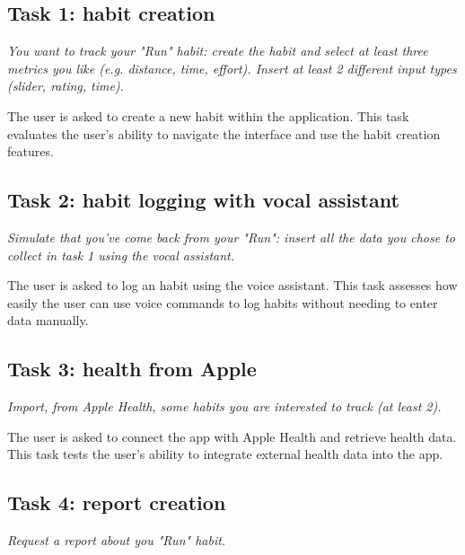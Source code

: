\documentclass{article}
\begin{document}
\subsection{Task 1: habit creation}

\begin{center}
	\textit{
		You want to track your "Run" habit: create the habit and select at least three metrics you like (e.g. distance, time, effort).
		Insert at least 2 different input types (slider, rating, time).
	}
\end{center}

The user is asked to create a new habit within the application.
This task evaluates the user's ability to navigate the interface and use the habit creation features.

\subsection{Task 2: habit logging with vocal assistant}

\begin{center}
	\textit{
		Simulate that you've come back from your "Run": insert all the data you chose to collect in task 1 using the vocal assistant.
	}
\end{center}

The user is asked to log an habit using the voice assistant.
This task assesses how easily the user can use voice commands to log habits without needing to enter data manually.

\subsection{Task 3: health from Apple}

\begin{center}
	\textit{
		Import, from Apple Health, some habits you are interested to track (at least 2).
	}
\end{center}

The user is asked to connect the app with Apple Health and retrieve health data.
This task tests the user’s ability to integrate external health data into the app.

\subsection{Task 4: report creation}

\begin{center}
	\textit{
		Request a report about you "Run" habit.
	}
\end{center}
\end{document}
